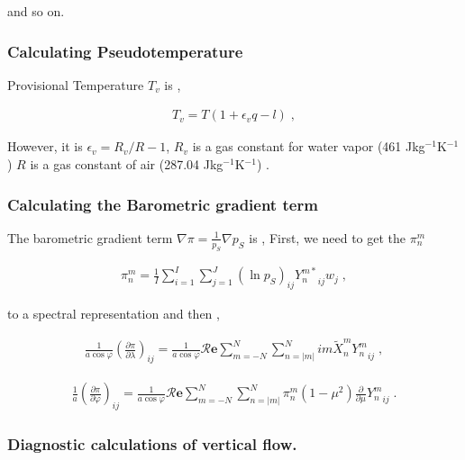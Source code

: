 and so on.

\hypertarget{calculating-pseudotemperature}{%
\subsubsection{Calculating
Pseudotemperature}\label{calculating-pseudotemperature}}

Provisional Temperature \(T_v\) is ,

\begin{eqnarray}
  T_v = T ( 1 + \epsilon_v q - l ) \; ,
\end{eqnarray}

However, it is \(\epsilon_v = R_v/R - 1\), \(R_v\) is a gas constant for
water vapor (461 Jkg\(^{-1}\)K\(^{-1}\)) \(R\) is a gas constant of air
(287.04 Jkg\(^{-1}\)K\(^{-1}\)) .

\hypertarget{calculating-the-barometric-gradient-term}{%
\subsubsection{Calculating the Barometric gradient
term}\label{calculating-the-barometric-gradient-term}}

The barometric gradient term \(\nabla \pi = \frac{1}{p_S} \nabla p_S\)
is , First, we need to get the \(\pi_n^m\)

\begin{eqnarray}
  \pi_n^m  =  \frac{1}{I} \sum_{i=1}^{I} \sum_{j=1}^{J}  
               (\ln {p_S})_{ij} {Y_n^{m *}}_{ij}  w_j \; ,
\end{eqnarray}

to a spectral representation and then ,

\begin{eqnarray}
   \frac{1}{a \cos \varphi} 
   \left( \frac{\partial \pi}{\partial \lambda} \right)_{ij}
     = 
   \frac{1}{a \cos \varphi} 
        {\mathcal R}\mathbf{e} \sum_{m=-N}^{N} \sum_{n=|m|}^{N} 
       im \tilde{X}_n^m {Y_n^m}_{ij}  \; ,
\end{eqnarray}

\begin{eqnarray}
   \frac{1}{a}
   \left( \frac{\partial \pi}{\partial \varphi} \right)_{ij}
     =  
   \frac{1}{a \cos \varphi} 
       {\mathcal R}\mathbf{e} \sum_{m=-N}^{N} \sum_{n=|m|}^{N} 
       \pi_n^m 
       ( 1-\mu^{2} ) \frac{\partial }{\partial \mu} {Y_n^m}_{ij}  \; .
\end{eqnarray}

\hypertarget{diagnostic-calculations-of-vertical-flow.}{%
\subsubsection{Diagnostic calculations of vertical
flow.}\label{diagnostic-calculations-of-vertical-flow.}}

